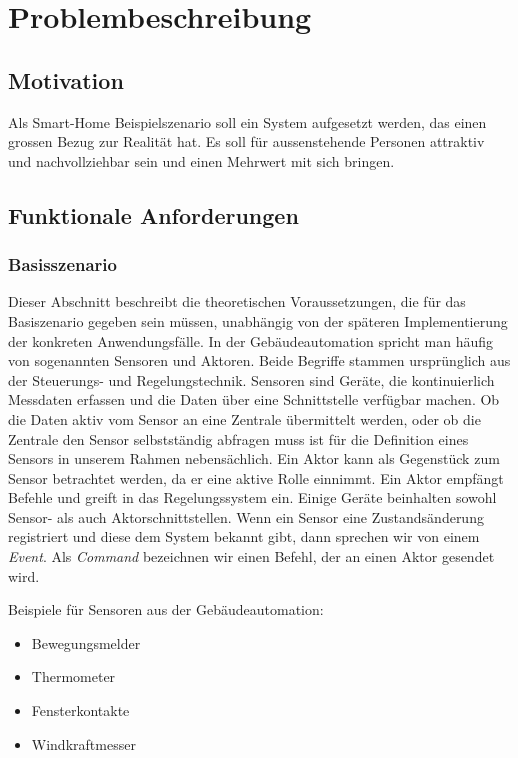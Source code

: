 \section{Problembeschreibung}

\subsection{Motivation}
Als Smart-Home Beispielszenario soll ein System aufgesetzt werden, das einen grossen Bezug zur Realität hat. Es soll für aussenstehende Personen attraktiv und nachvollziehbar sein und einen Mehrwert mit sich bringen.


\subsection{Funktionale Anforderungen}
\subsubsection{Basisszenario}
Dieser Abschnitt beschreibt die theoretischen Voraussetzungen, die für das Basiszenario gegeben sein müssen, unabhängig von der späteren Implementierung der konkreten Anwendungsfälle.
In der Gebäudeautomation spricht man häufig von sogenannten Sensoren und Aktoren. Beide Begriffe stammen ursprünglich aus der Steuerungs- und Regelungstechnik. Sensoren sind Geräte, die kontinuierlich Messdaten erfassen und die Daten über eine Schnittstelle verfügbar machen. Ob die Daten aktiv vom Sensor an eine Zentrale übermittelt werden, oder ob die Zentrale den Sensor selbstständig abfragen muss ist für die Definition eines Sensors in unserem Rahmen nebensächlich. Ein Aktor kann als Gegenstück zum Sensor betrachtet werden, da er eine aktive Rolle einnimmt. Ein Aktor empfängt Befehle und greift in das Regelungssystem ein. Einige Geräte beinhalten sowohl Sensor- als auch Aktorschnittstellen. Wenn ein Sensor eine Zustandsänderung registriert und diese dem System bekannt gibt, dann sprechen wir von einem \textit{Event}. Als \textit{Command} bezeichnen wir einen Befehl, der an einen Aktor gesendet wird.

Beispiele für Sensoren aus der Gebäudeautomation:

\begin{itemize}
	\item Bewegungsmelder
	\item Thermometer
	\item Fensterkontakte
	\item Windkraftmesser
\end{itemize}

